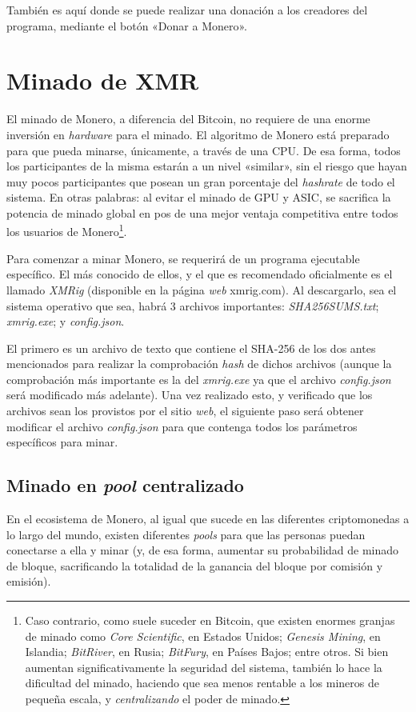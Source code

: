 \documentclass[12pt,a4paper,twoside]{book}
\begin{document}
También es aquí donde se puede realizar una donación a los creadores del programa, mediante el botón «Donar a Monero».

\section{Minado de XMR}
El minado de Monero, a diferencia del Bitcoin, no requiere de una enorme inversión en \textit{hardware} para el minado. El algoritmo de Monero está preparado para que pueda minarse, únicamente, a través de una CPU. De esa forma, todos los participantes de la misma estarán a un nivel «similar», sin el riesgo que hayan muy pocos participantes que posean un gran porcentaje del \textit{hashrate} de todo el sistema. En otras palabras: al evitar el minado de GPU y ASIC, se sacrifica la potencia de minado global en pos de una mejor ventaja competitiva entre todos los usuarios de Monero\footnote{Caso contrario, como suele suceder en Bitcoin, que existen enormes granjas de minado como \textit{Core Scientific}, en Estados Unidos; \textit{Genesis Mining}, en Islandia; \textit{BitRiver}, en Rusia; \textit{BitFury}, en Países Bajos; entre otros. Si bien aumentan significativamente la seguridad del sistema, también lo hace la dificultad del minado, haciendo que sea menos rentable a los mineros de pequeña escala, y \textit{centralizando} el poder de minado.}.

Para comenzar a minar Monero, se requerirá de un programa ejecutable específico. El más conocido de ellos, y el que es recomendado oficialmente es el llamado \textit{XMRig} (disponible en la página \textit{web} xmrig.com). Al descargarlo, sea el sistema operativo que sea, habrá 3 archivos importantes: \textit{SHA256SUMS.txt}; \textit{xmrig.exe}; y \textit{config.json}.

El primero es un archivo de texto que contiene el SHA-256 de los dos antes mencionados para realizar la comprobación \textit{hash} de dichos archivos (aunque la comprobación más importante es la del \textit{xmrig.exe} ya que el archivo \textit{config.json} será modificado más adelante). Una vez realizado esto, y verificado que los archivos sean los provistos por el sitio \textit{web}, el siguiente paso será obtener modificar el archivo \textit{config.json} para que contenga todos los parámetros específicos para minar.

\subsection{Minado en \textit{pool} centralizado}
En el ecosistema de Monero, al igual que sucede en las diferentes criptomonedas a lo largo del mundo, existen diferentes \textit{pools} para que las personas puedan conectarse a ella y minar (y, de esa forma, aumentar su probabilidad de minado de bloque, sacrificando la totalidad de la ganancia del bloque por comisión y emisión).
\end{document}
